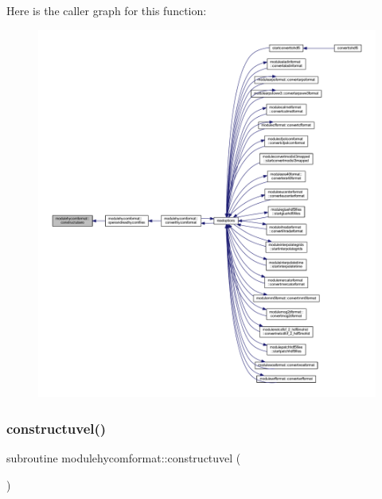 Here is the caller graph for this function\+:\nopagebreak
\begin{figure}[H]
\begin{center}
\leavevmode
\includegraphics[width=350pt]{namespacemodulehycomformat_a781579f6c0af167e5857fa0b7f9caf6a_icgraph}
\end{center}
\end{figure}
\mbox{\label{namespacemodulehycomformat_a9e6467cf7daa8b6be0aef68805d1ab7c}} 
\subsubsection{\texorpdfstring{constructuvel()}{constructuvel()}}
{\footnotesize\ttfamily subroutine modulehycomformat\+::constructuvel (\begin{DoxyParamCaption}{ }\end{DoxyParamCaption})\hspace{0.3cm}{\ttfamily [private]}}

